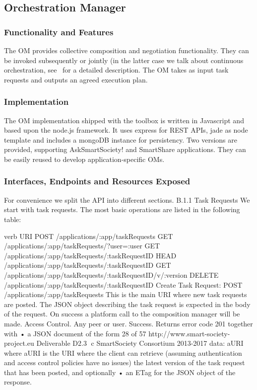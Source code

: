 \subsection{Orchestration Manager}
\subsubsection{Functionality and Features}
The OM provides collective composition and negotiation functionality. They can be invoked subsequently or jointly (in the latter case we talk about continuous orchestration, see~\cite{D6.2} for a detailed description. The OM takes as input task requests and outputs an agreed execution plan. 
\subsubsection{Implementation}
The OM implementation shipped with the toolbox is written in Javascript and based upon the node.js framework. It uses express for REST APIs, jade as node template and includes a mongoDB instance for persistency. Two versions are provided, supporting AskSmartSociety! and SmartShare applications. They can be easily reused to develop application-specific OMs.
\subsubsection{Interfaces, Endpoints and Resources Exposed}
For convenience we split the API into different sections.
B.1.1 Task Requests
We start with task requests. The most basic operations are listed in the following table:
 
verb
URI
POST
/applications/:app/taskRequests
GET
/applications/:app/taskRequests/?user=:user
GET
/applications/:app/taskRequests/:taskRequestID
HEAD
/applications/:app/taskRequests/:taskRequestID
GET
/applications/:app/taskRequests/:taskRequestID/v/:version
DELETE
/applications/:app/taskRequests/:taskRequestID
Create Task Request: POST /applications/:app/taskRequests This is the main URI where new task requests are posted. The JSON object describing the task request is expected in the body of the request. On success a platform call to the composition manager will be made.
Access Control. Any peer or user.
Success. Returns error code 201 together with
• a JSON document of the form {
28 of 57
http://www.smart-society-project.eu
Deliverable D2.3 ⃝c SmartSociety Consortium 2013-2017 data: aURI
}
where aURI is the URI where the client can retrieve (assuming authentication and access control policies have no issues) the latest version of the task request that has been posted, and optionally
• an ETag for the JSON object of the response.


